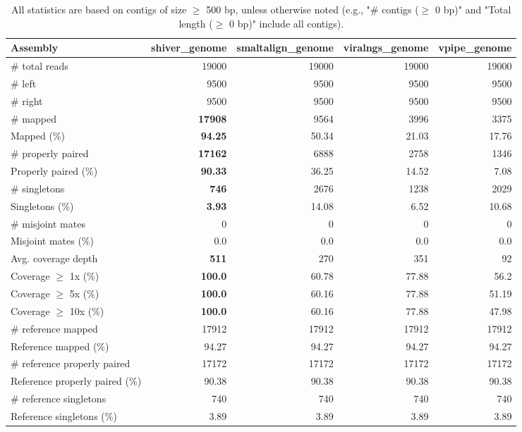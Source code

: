 \documentclass[12pt,a4paper]{article}
\begin{document}
\begin{table}[ht]
\begin{center}
\caption{All statistics are based on contigs of size $\geq$ 500 bp, unless otherwise noted (e.g., "\# contigs ($\geq$ 0 bp)" and "Total length ($\geq$ 0 bp)" include all contigs).}
\begin{tabular}{|l*{4}{|r}|}
\hline
Assembly & shiver\_genome & smaltalign\_genome & viralngs\_genome & vpipe\_genome \\ \hline
\# total reads & 19000 & 19000 & 19000 & 19000 \\ \hline
\# left & 9500 & 9500 & 9500 & 9500 \\ \hline
\# right & 9500 & 9500 & 9500 & 9500 \\ \hline
\# mapped & {\bf 17908} & 9564 & 3996 & 3375 \\ \hline
Mapped (\%) & {\bf 94.25} & 50.34 & 21.03 & 17.76 \\ \hline
\# properly paired & {\bf 17162} & 6888 & 2758 & 1346 \\ \hline
Properly paired (\%) & {\bf 90.33} & 36.25 & 14.52 & 7.08 \\ \hline
\# singletons & {\bf 746} & 2676 & 1238 & 2029 \\ \hline
Singletons (\%) & {\bf 3.93} & 14.08 & 6.52 & 10.68 \\ \hline
\# misjoint mates & 0 & 0 & 0 & 0 \\ \hline
Misjoint mates (\%) & 0.0 & 0.0 & 0.0 & 0.0 \\ \hline
Avg. coverage depth & {\bf 511} & 270 & 351 & 92 \\ \hline
Coverage $\geq$ 1x (\%) & {\bf 100.0} & 60.78 & 77.88 & 56.2 \\ \hline
Coverage $\geq$ 5x (\%) & {\bf 100.0} & 60.16 & 77.88 & 51.19 \\ \hline
Coverage $\geq$ 10x (\%) & {\bf 100.0} & 60.16 & 77.88 & 47.98 \\ \hline
\# reference mapped & 17912 & 17912 & 17912 & 17912 \\ \hline
Reference mapped (\%) & 94.27 & 94.27 & 94.27 & 94.27 \\ \hline
\# reference properly paired & 17172 & 17172 & 17172 & 17172 \\ \hline
Reference properly paired (\%) & 90.38 & 90.38 & 90.38 & 90.38 \\ \hline
\# reference singletons & 740 & 740 & 740 & 740 \\ \hline
Reference singletons (\%) & 3.89 & 3.89 & 3.89 & 3.89 \\ \hline

\end{tabular}
\end{center}
\end{table}
\end{document}
